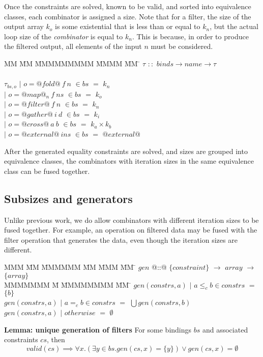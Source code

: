 Once the constraints are solved, known to be valid, and sorted into equivalence classes, each combinator is assigned a size.
Note that for a filter, the size of the output array $k_o$ is some existential that is less than or equal to $k_n$, but the actual loop size of the \emph{combinator} is equal to $k_n$.
This is because, in order to produce the filtered output, all elements of the input $n$ must be considered.


\begin{tabbing}
MM \= MM \= MMMMMMMMM \= MMMM \= MM \= \kill
$\tau$  \>$::$\> $binds \rightarrow name \rightarrow \tau$ \\
\\
$\tau_{bs,o}$    
            \> $|$ \> $o = @fold@~f~n$      \> $\in bs$ \> $=$ \> $k_n$ \\
            \> $|$ \> $o = @map@_n~f~ns$    \> $\in bs$ \> $=$ \> $k_o$ \\
            \> $|$ \> $o = @filter@~f~n$    \> $\in bs$ \> $=$ \> $k_n$ \\
            \> $|$ \> $o = @gather@~i~d$    \> $\in bs$ \> $=$ \> $k_i$ \\
            \> $|$ \> $o = @cross@~a~b$     \> $\in bs$ \> $=$ \> $k_a \times k_b$ \\
            \> $|$ \> $o = @external@~ins$  \> $\in bs$ \> $=$ \> $@external@$ \\
\end{tabbing}

After the generated equality constraints are solved, and sizes are grouped into equivalence classes, the combinators with iteration sizes in the same equivalence class can be fused together.

\subsection{Subsizes and generators}
Unlike previous work, we do allow combinators with different iteration sizes to be fused together.
For example, an operation on filtered data may be fused with the filter operation that generates the data, even though the iteration sizes are different.



\begin{tabbing}
MMM       \= MM \= MMMMMM \= MM \= MMM \= MM \= \kill
$gen$   \> @::@  \> $\{constraint\}$  \> $\to$ \> $array$ \> $\to$ \> $\{array\}$ \\
MMMMMMM                 \= M  \= MMMMMMMM \= MM \= \kill
$gen(constrs, a)$ \> $|$ \> $a \le_c b \in constrs$ \> $=$ \> $\{b\}$                        \\
$gen(constrs, a)$ \> $|$ \> $a =_c b \in constrs$   \> $=$ \> $\bigcup gen(constrs, b)$                        \\
$gen(constrs, a)$ \> $|$ \> $otherwise$             \> $=$ \> $\emptyset$                        \\
\end{tabbing}

\textbf{Lemma: unique generation of filters}
For some bindings $bs$ and associated constraints $cs$, then
\[
valid(cs) \implies \forall x. (\exists y \in bs. gen(cs, x) = \{y\}) \vee gen(cs, x) = \emptyset
\]

